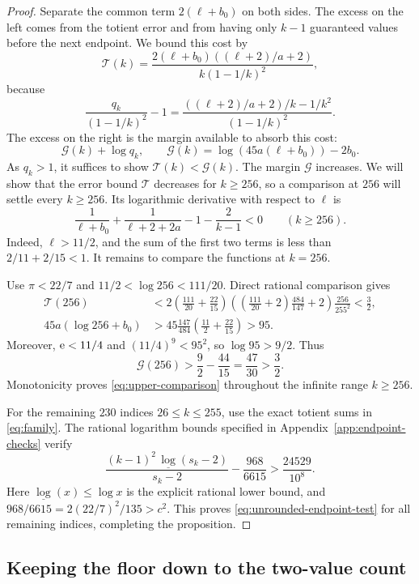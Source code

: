 \begin{proof}
Separate the common term $2(\ell+b_0)$ on both sides.
The excess on the left comes from the totient error and from
having only $k-1$ guaranteed values before the next endpoint.
We bound this cost by
\[
 \mathcal T(k)=
 \frac{2(\ell+b_0)((\ell+2)/a+2)}{k(1-1/k)^2},
\]
because
\[
 \frac{q_k}{(1-1/k)^2}-1
   =\frac{((\ell+2)/a+2)/k-1/k^2}{(1-1/k)^2}.
\]
The excess on the right is the margin available to absorb this cost:
\[
 \mathcal G(k)+\log q_k,\qquad
 \mathcal G(k)=\log(45a(\ell+b_0))-2b_0.
\]
As $q_k>1$, it suffices to show $\mathcal T(k)<\mathcal G(k)$.
The margin $\mathcal G$ increases. We will show that the error
bound $\mathcal T$ decreases for $k\ge256$, so a comparison at
$256$ will settle every $k\ge256$. Its logarithmic
derivative with respect to $\ell$ is
\[
 \frac1{\ell+b_0}+\frac1{\ell+2+2a}-1-\frac2{k-1}<0
                       \qquad(k\ge256).
\]
Indeed, $\ell>11/2$, and the sum of the first two terms is
less than $2/11+2/15<1$. It remains to compare the functions
at $k=256$.

Use $\pi<22/7$ and $11/2<\log256<111/20$. Direct rational
comparison gives
\begin{align}
 \mathcal T(256)
 &<2\left(\frac{111}{20}+\frac{22}{15}\right)
   \left(\left(\frac{111}{20}+2\right)\frac{484}{147}+2\right)
   \frac{256}{255^2}<\frac32,\label{eq:tail-T}\\
 45a(\log256+b_0)&>
       45\frac{147}{484}\left(\frac{11}{2}+\frac{22}{15}\right)>95.
       \label{eq:tail-G}
\end{align}
Moreover, $\mathrm e<11/4$ and $(11/4)^9<95^2$, so
$\log95>9/2$. Thus
\[
 \mathcal G(256)>\frac92-\frac{44}{15}=\frac{47}{30}>\frac32.
\]
Monotonicity proves \eqref{eq:upper-comparison} throughout the
infinite range $k\ge256$.

For the remaining $230$ indices $26\le k\le255$, use the exact
totient sums in \eqref{eq:family}. The rational logarithm bounds
specified in Appendix~\ref{app:endpoint-checks} verify
\[
 \frac{(k-1)^2\,\underline{\log}(s_k-2)}{s_k-2}
       -\frac{968}{6615}>\frac{24529}{10^8}.
\]
Here $\underline{\log}(x)\le\log x$ is the explicit rational
lower bound, and $968/6615=2(22/7)^2/135>c^2$.
This proves \eqref{eq:unrounded-endpoint-test} for all remaining
indices, completing the proposition.
\end{proof}

\subsection{Keeping the floor down to the two-value count}

